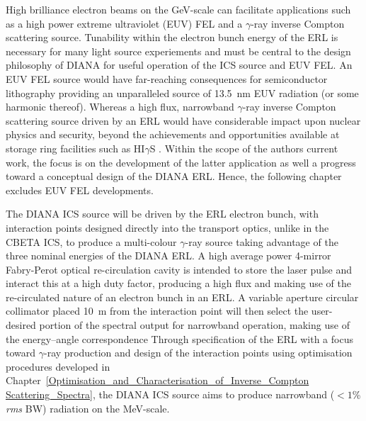 \documentclass[../main.tex]{subfiles}
\begin{document}
High brilliance electron beams on the \si{\giga\electronvolt}-scale can facilitate applications such as a high power extreme ultraviolet (EUV) FEL and a $\gamma$-ray inverse Compton scattering source. Tunability within the electron bunch energy of the ERL is necessary for many light source experiements and must be central to the design philosophy of DIANA for useful operation of the ICS source and EUV FEL. An EUV FEL source would have far-reaching consequences for semiconductor lithography providing an unparalleled source of 13.5~\si{\nano\meter} EUV radiation (or some harmonic thereof). Whereas a high flux, narrowband  $\gamma$-ray inverse Compton scattering source driven by an ERL would have considerable impact upon nuclear physics and security, beyond the achievements and opportunities available at storage ring facilities such as HI$\gamma$S \cite{weller2009research}. Within the scope of the authors current work, the focus is on the development of the latter application as well a progress toward a conceptual design of the DIANA ERL. Hence, the following chapter excludes EUV FEL developments.

The DIANA ICS source will be driven by the ERL electron bunch, with interaction points designed directly into the transport optics, unlike in the CBETA ICS, to produce a multi-colour $\gamma$-ray source taking advantage of the three nominal energies of the DIANA ERL. A high average power 4-mirror Fabry-Perot optical re-circulation cavity is intended to store the laser pulse and interact this at a high duty factor, producing a high flux and making use of the re-circulated nature of an electron bunch in an ERL. A variable aperture circular collimator placed 10~\si{\meter} from the interaction point will then select the user-desired portion of the spectral output for narrowband operation, making use of the energy--angle correspondence  Through specification of the ERL with a focus toward $\gamma$-ray production and design of the interaction points using optimisation procedures developed in Chapter~\ref{Optimisation_and_Characterisation_of_Inverse_Compton Scattering_Spectra}, the DIANA ICS source aims to produce narrowband ($< 1$\% \textit{rms} BW) radiation on the \si{\mega\electronvolt}-scale. 
\end{document}
